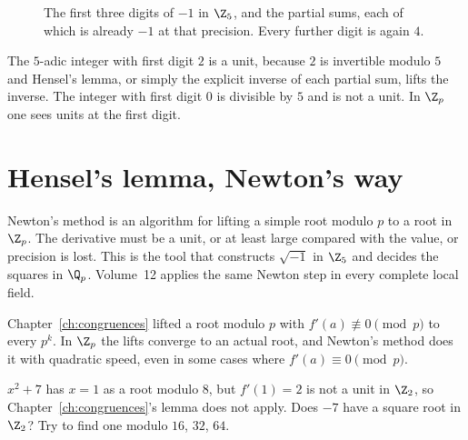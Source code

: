 \begin{figure}[ht]
\centering
{}
\caption{The first three digits of $-1$ in $\Z_5$, and the partial sums, each of which is already $-1$ at that precision. Every further digit is again $4$.}
\label{fig:t1-minusone}
\end{figure}

\begin{examplex}
The $5$-adic integer with first digit $2$ is a unit, because $2$ is invertible modulo $5$ and Hensel's lemma, or simply the explicit inverse of each partial sum, lifts the inverse. The integer with first digit $0$ is divisible by $5$ and is not a unit. In $\Z_p$ one sees units at the first digit.
\end{examplex}

\section{Hensel's lemma, Newton's way}

Newton's method is an algorithm for lifting a simple root modulo $p$ to a root in $\Z_p$. The derivative must be a unit, or at least large compared with the value, or precision is lost. This is the tool that constructs $\sqrt{-1}$ in $\Z_5$ and decides the squares in $\Q_p$. Volume~12 applies the same Newton step in every complete local field.

Chapter~\ref{ch:congruences} lifted a root modulo $p$ with $f'(a)\not\equiv0\pmod p$ to every $p^k$. In $\Z_p$ the lifts converge to an actual root, and Newton's method does it with quadratic speed, even in some cases where $f'(a)\equiv0\pmod p$.

\begin{think}
$x^2+7$ has $x=1$ as a root modulo $8$, but $f'(1)=2$ is not a unit in $\Z_2$, so Chapter~\ref{ch:congruences}'s lemma does not apply. Does $-7$ have a square root in $\Z_2$? Try to find one modulo $16$, $32$, $64$.
\end{think}

